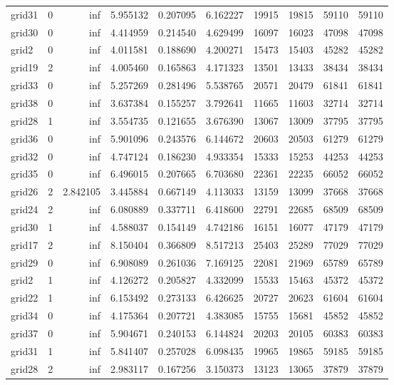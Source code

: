 \begin{longtable}{|l|r|r|r|r|r|r|r|r|r|}
grid31 & 0 & inf & 5.955132 & 0.207095 & 6.162227 & 19915 & 19815 & 59110 & 59110 \\
grid30 & 0 & inf & 4.414959 & 0.214540 & 4.629499 & 16097 & 16023 & 47098 & 47098 \\
grid2 & 0 & inf & 4.011581 & 0.188690 & 4.200271 & 15473 & 15403 & 45282 & 45282 \\
grid19 & 2 & inf & 4.005460 & 0.165863 & 4.171323 & 13501 & 13433 & 38434 & 38434 \\
grid33 & 0 & inf & 5.257269 & 0.281496 & 5.538765 & 20571 & 20479 & 61841 & 61841 \\
grid38 & 0 & inf & 3.637384 & 0.155257 & 3.792641 & 11665 & 11603 & 32714 & 32714 \\
grid28 & 1 & inf & 3.554735 & 0.121655 & 3.676390 & 13067 & 13009 & 37795 & 37795 \\
grid36 & 0 & inf & 5.901096 & 0.243576 & 6.144672 & 20603 & 20503 & 61279 & 61279 \\
grid32 & 0 & inf & 4.747124 & 0.186230 & 4.933354 & 15333 & 15253 & 44253 & 44253 \\
grid35 & 0 & inf & 6.496015 & 0.207665 & 6.703680 & 22361 & 22235 & 66052 & 66052 \\
grid26 & 2 & 2.842105 & 3.445884 & 0.667149 & 4.113033 & 13159 & 13099 & 37668 & 37668 \\
grid24 & 2 & inf & 6.080889 & 0.337711 & 6.418600 & 22791 & 22685 & 68509 & 68509 \\
grid30 & 1 & inf & 4.588037 & 0.154149 & 4.742186 & 16151 & 16077 & 47179 & 47179 \\
grid17 & 2 & inf & 8.150404 & 0.366809 & 8.517213 & 25403 & 25289 & 77029 & 77029 \\
grid29 & 0 & inf & 6.908089 & 0.261036 & 7.169125 & 22081 & 21969 & 65789 & 65789 \\
grid2 & 1 & inf & 4.126272 & 0.205827 & 4.332099 & 15533 & 15463 & 45372 & 45372 \\
grid22 & 1 & inf & 6.153492 & 0.273133 & 6.426625 & 20727 & 20623 & 61604 & 61604 \\
grid34 & 0 & inf & 4.175364 & 0.207721 & 4.383085 & 15755 & 15681 & 45852 & 45852 \\
grid37 & 0 & inf & 5.904671 & 0.240153 & 6.144824 & 20203 & 20105 & 60383 & 60383 \\
grid31 & 1 & inf & 5.841407 & 0.257028 & 6.098435 & 19965 & 19865 & 59185 & 59185 \\
grid28 & 2 & inf & 2.983117 & 0.167256 & 3.150373 & 13123 & 13065 & 37879 & 37879 \\

\end{longtable}
